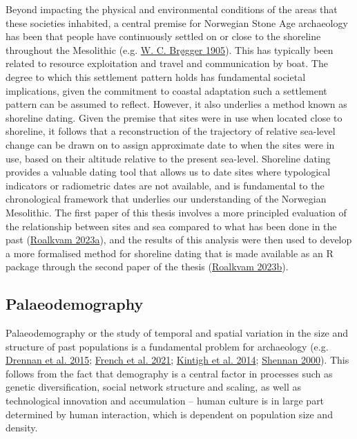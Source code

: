 \documentclass[
  12pt,
  a4paper,
  oneside]{book}
\begin{document}
Beyond impacting the physical and environmental conditions of the areas that these societies inhabited, a central premise for Norwegian Stone Age archaeology has been that people have continuously settled on or close to the shoreline throughout the Mesolithic (e.g. \protect\hyperlink{ref-brogger1905}{W. C. Brøgger 1905}). This has typically been related to resource exploitation and travel and communication by boat. The degree to which this settlement pattern holds has fundamental societal implications, given the commitment to coastal adaptation such a settlement pattern can be assumed to reflect. However, it also underlies a method known as shoreline dating. Given the premise that sites were in use when located close to shoreline, it follows that a reconstruction of the trajectory of relative sea-level change can be drawn on to assign approximate date to when the sites were in use, based on their altitude relative to the present sea-level. Shoreline dating provides a valuable dating tool that allows us to date sites where typological indicators or radiometric dates are not available, and is fundamental to the chronological framework that underlies our understanding of the Norwegian Mesolithic. The first paper of this thesis involves a more principled evaluation of the relationship between sites and sea compared to what has been done in the past (\protect\hyperlink{ref-roalkvam2023}{Roalkvam 2023a}), and the results of this analysis were then used to develop a more formalised method for shoreline dating that is made available as an R package through the second paper of the thesis (\protect\hyperlink{ref-roalkvam2023b}{Roalkvam 2023b}).

\hypertarget{palaeodemography}{%
\subsection{Palaeodemography}\label{palaeodemography}}

Palaeodemography or the study of temporal and spatial variation in the size and structure of past populations is a fundamental problem for archaeology (e.g. \protect\hyperlink{ref-drennan2015}{Drennan et al. 2015}; \protect\hyperlink{ref-french2021}{French et al. 2021}; \protect\hyperlink{ref-kintigh2014}{Kintigh et al. 2014}; \protect\hyperlink{ref-shennan2000}{Shennan 2000}). This follows from the fact that demography is a central factor in processes such as genetic diversification, social network structure and scaling, as well as technological innovation and accumulation -- human culture is in large part determined by human interaction, which is dependent on population size and density.
\end{document}
